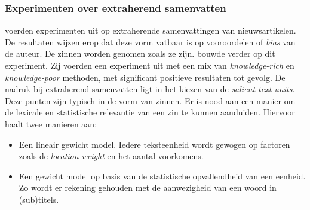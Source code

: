 

\subsubsection{Experimenten over extraherend samenvatten}

\textcite{McKeown1999} voerden experimenten uit op extraherende samenvattingen van nieuwsartikelen. De resultaten wijzen erop dat deze vorm vatbaar is op vooroordelen of \textit{bias} van de auteur. De zinnen worden genomen zoals ze zijn. \textcite{Hahn2000} bouwde verder op dit experiment. Zij voerden een experiment uit met een mix van \textit{knowledge-rich} en \textit{knowledge-poor} methoden, met significant positieve resultaten tot gevolg. De nadruk bij extraherend samenvatten ligt in het kiezen van de \textit{salient text units}. Deze punten zijn typisch in de vorm van zinnen. Er is nood aan een manier om de lexicale en statistische relevantie van een zin te kunnen aanduiden. Hiervoor haalt \textcite{Hahn2000} twee manieren aan:

\begin{itemize}
	\item Een lineair gewicht model. Iedere teksteenheid wordt gewogen op factoren zoals de \textit{location weight} en het aantal voorkomens.
	\item Een gewicht model op basis van de statistische opvallendheid van een eenheid. Zo wordt er rekening gehouden met de aanwezigheid van een woord in (sub)titels.
\end{itemize}

